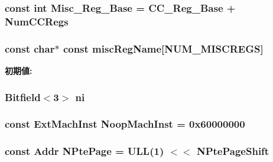 \label{namespacePowerISA_a1e61430dd10c247a98518b5cc3cf70e8}
\hypertarget{namespacePowerISA_a0ff03b99f2760c682de4e9cb0a3cd8a1}{
\subsubsection[{Misc\_\-Reg\_\-Base}]{\setlength{\rightskip}{0pt plus 5cm}const int {\bf Misc\_\-Reg\_\-Base} = {\bf CC\_\-Reg\_\-Base} + {\bf NumCCRegs}}}
\label{namespacePowerISA_a0ff03b99f2760c682de4e9cb0a3cd8a1}
\hypertarget{namespacePowerISA_a25c189cc6686d2796be597f69b3a94a6}{
\subsubsection[{miscRegName}]{\setlength{\rightskip}{0pt plus 5cm}const char$\ast$ const {\bf miscRegName}\mbox{[}NUM\_\-MISCREGS\mbox{]}}}
\label{namespacePowerISA_a25c189cc6686d2796be597f69b3a94a6}
{\bfseries 初期値:}
\begin{DoxyCode}
 {
}
\end{DoxyCode}
\hypertarget{namespacePowerISA_a0d135b3f711d2c44104273381230e399}{
\subsubsection[{ni}]{\setlength{\rightskip}{0pt plus 5cm}Bitfield$<$3$>$ {\bf ni}}}
\label{namespacePowerISA_a0d135b3f711d2c44104273381230e399}
\hypertarget{namespacePowerISA_a8d1e39e0ea757dcc9725c6ccd81dd4c4}{
\subsubsection[{NoopMachInst}]{\setlength{\rightskip}{0pt plus 5cm}const ExtMachInst {\bf NoopMachInst} = 0x60000000}}
\label{namespacePowerISA_a8d1e39e0ea757dcc9725c6ccd81dd4c4}
\hypertarget{namespacePowerISA_ae295358052b4e754e08cd5cd763c212a}{
\subsubsection[{NPtePage}]{\setlength{\rightskip}{0pt plus 5cm}const {\bf Addr} {\bf NPtePage} = ULL(1) $<$$<$ {\bf NPtePageShift}}}

